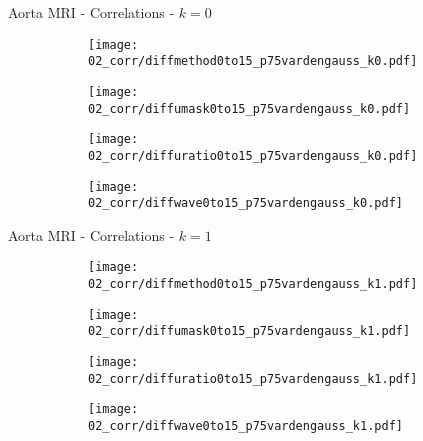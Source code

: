 \documentclass{beamer}
\begin{document}
\begin{frame}{Aorta MRI - Correlations - $k=0$}{}
\begin{figure}
\centering
\begin{subfigure}{0.24\textwidth}
\texttt{[image: 02\_corr/diffmethod0to15\_p75vardengauss\_k0.pdf]}
\end{subfigure}
\begin{subfigure}{0.24\textwidth}
\texttt{[image: 02\_corr/diffumask0to15\_p75vardengauss\_k0.pdf]}
\end{subfigure}
\begin{subfigure}{0.24\textwidth}
\texttt{[image: 02\_corr/diffuratio0to15\_p75vardengauss\_k0.pdf]}
\end{subfigure}
\begin{subfigure}{0.24\textwidth}
\texttt{[image: 02\_corr/diffwave0to15\_p75vardengauss\_k0.pdf]}
\end{subfigure}
\end{figure}
\end{frame}

\begin{frame}{Aorta MRI - Correlations - $k=1$}{}
\begin{figure}
\centering
\begin{subfigure}{0.24\textwidth}
\texttt{[image: 02\_corr/diffmethod0to15\_p75vardengauss\_k1.pdf]}
\end{subfigure}
\begin{subfigure}{0.24\textwidth}
\texttt{[image: 02\_corr/diffumask0to15\_p75vardengauss\_k1.pdf]}
\end{subfigure}
\begin{subfigure}{0.24\textwidth}
\texttt{[image: 02\_corr/diffuratio0to15\_p75vardengauss\_k1.pdf]}
\end{subfigure}
\begin{subfigure}{0.24\textwidth}
\texttt{[image: 02\_corr/diffwave0to15\_p75vardengauss\_k1.pdf]}
\end{subfigure}
\end{figure}
\end{frame}
\end{document}
